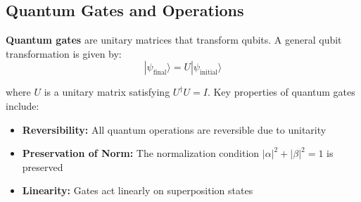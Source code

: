 \subsection*{Quantum Gates and Operations} 

\textbf{Quantum gates} are unitary matrices that transform qubits. A general
qubit transformation is given by:
\[
  |\psi_{\text{final}}\rangle = U |\psi_{\text{initial}}\rangle
\]

\noindent
where $U$ is a unitary matrix satisfying $U^\dagger U = I$. Key properties of
quantum gates include:


\begin{itemize}
  \item \textbf{Reversibility:} All quantum operations are reversible due
    to unitarity

  \item \textbf{Preservation of Norm:} The normalization condition
    $|\alpha|^2 + |\beta|^2 = 1$ is preserved

  \item \textbf{Linearity:} Gates act linearly on superposition states

\end{itemize}

